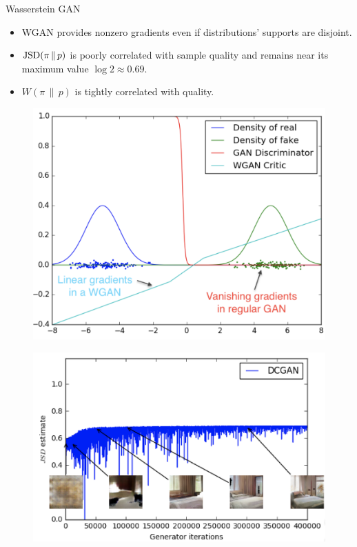 \documentclass{beamer}
\begin{document}
\begin{frame}{Wasserstein GAN}
	\begin{minipage}[t]{0.6\columnwidth}
		\begin{itemize}
			\item WGAN provides nonzero gradients even if distributions' supports are disjoint.
			\item $\mathrm{JSD}(\pi\,\|\,p)$ is poorly correlated with sample quality and remains near its maximum value $\log 2 \approx 0.69$.
			\item $W(\pi\,\|\,p)$ is tightly correlated with quality.
		\end{itemize}
	\end{minipage}%
	\begin{minipage}[t]{0.4\columnwidth}
		\begin{figure}
			\centering
			\includegraphics[width=\linewidth]{figs/wgan_toy}
		\end{figure}
	\end{minipage}
	\begin{minipage}[t]{0.5\columnwidth}
		\begin{figure}
			\centering
			\includegraphics[width=0.95\linewidth]{figs/dcgan_quality}

\end{figure}
\end{minipage}
\end{frame}
\end{document}
